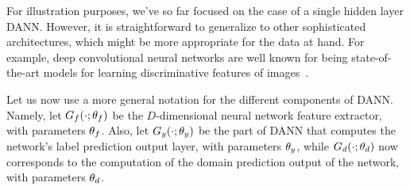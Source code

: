 

%


For illustration purposes, we've so far focused on the case of a single hidden layer DANN. However, it is straightforward to generalize to other sophisticated architectures, which might be more appropriate for the data at hand. For example,  deep convolutional neural networks are well known for being state-of-the-art models for learning discriminative features of images~\citep{Krizhevsky12}.

Let us now use a more general notation for the different components of DANN. Namely, let $G_f(\cdot; {\theta_f})$ be the $D$-dimensional neural network feature extractor, with parameters ${\theta_f}$. Also, let $G_y(\cdot; {\theta_y})$ be the part of DANN that computes the network's label prediction output layer, with parameters ${\theta_y}$, while $G_d(\cdot;{\theta_d})$ now corresponds to the computation of the domain prediction output of the network, with parameters ${\theta_d}$.

